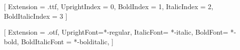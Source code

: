 
\newfontfamily{}[
    Extension      = .ttf,
    UprightIndex   = 0,
    BoldIndex      = 1,
    ItalicIndex    = 2,
    BoldItalicIndex = 3
]

\newfontfamily{}[
    Extension      = .otf,%
    UprightFont=*-regular,%
    ItalicFont= *-italic,%
    BoldFont= *-bold,%
    BoldItalicFont = *-bolditalic,%
]%

